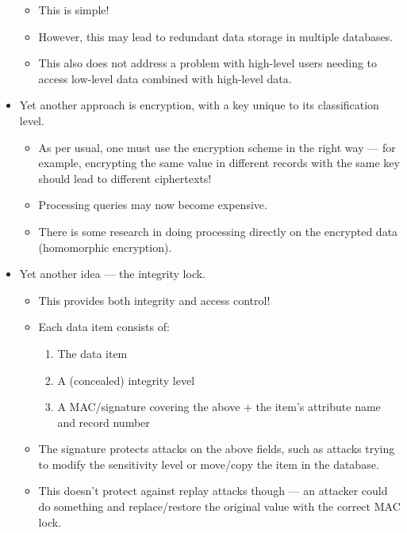 \documentclass{article}
\begin{document}
\begin{itemize}
\begin{itemize}
            \item This is simple!
            \item However, this may lead to redundant data storage in multiple databases.
            \item This also does not address a problem with high-level users needing to access low-level data combined with high-level data.
        \end{itemize}
    \item Yet another approach is encryption, with a key unique to its classification level.
        \begin{itemize}
            \item As per usual, one must use the encryption scheme in the right way --- for example, encrypting the same value in different records with the same key should lead to different ciphertexts!
            \item Processing queries may now become expensive.
            \item There is some research in doing processing directly on the encrypted data (homomorphic encryption).
        \end{itemize}
    \item Yet another idea --- the integrity lock.
        \begin{itemize}
            \item This provides both integrity and access control!
            \item Each data item consists of:
                \begin{enumerate}
                    \item The data item
                    \item A (concealed) integrity level
                    \item A MAC/signature covering the above + the item's attribute name and record number
                \end{enumerate}
            \item The signature protects attacks on the above fields, such as attacks trying to modify the sensitivity level or move/copy the item in the database.
            \item This doesn't protect against replay attacks though --- an attacker could do something and replace/restore the original value with the correct MAC lock.
        \end{itemize}
\end{itemize}
\end{document}
